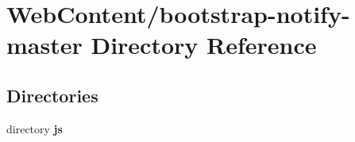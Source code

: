 \section{Web\-Content/bootstrap-\/notify-\/master Directory Reference}
\label{dir_9bf2af018d2b534751217a787ea2d120}
\subsection*{Directories}
\begin{DoxyCompactItemize}
\item 
directory {\bf js}
\end{DoxyCompactItemize}
